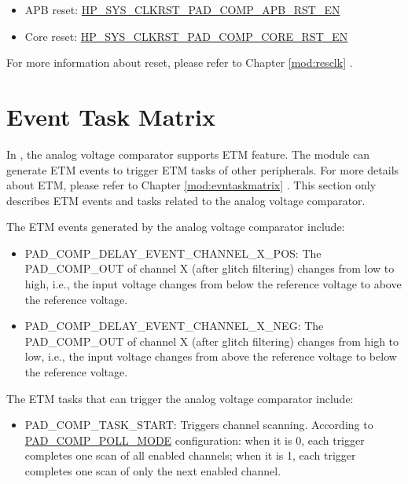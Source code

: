 \documentclass[main\_\_EN.tex]{subfiles}
\begin{document}
\begin{itemize}
    \item APB reset: \hyperref[fielddesc:HPSYSCLKRSTPADCOMPAPBRSTEN]{HP\_SYS\_CLKRST\_PAD\_COMP\_APB\_RST\_EN}
    \item Core reset: \hyperref[fielddesc:HPSYSCLKRSTPADCOMPCORERSTEN]{HP\_SYS\_CLKRST\_PAD\_COMP\_CORE\_RST\_EN}
\end{itemize}

For more information about reset, please refer to Chapter \ref{mod:resclk} \textit{}.


\section{Event Task Matrix}
\label{sec:anacom-etm-func}

In \chipname{}, the analog voltage comparator supports ETM feature. The module can generate ETM events to trigger ETM tasks of other peripherals. For more details about ETM, please refer to Chapter \ref{mod:evntaskmatrix} . This section only describes ETM events and tasks related to the analog voltage comparator.

The ETM events generated by the analog voltage comparator include:

\begin{itemize}
    \item PAD\_COMP\_DELAY\_EVENT\_CHANNEL\_X\_POS: The PAD\_COMP\_OUT of channel X (after glitch filtering) changes from low to high, i.e., the input voltage changes from below the reference voltage to above the reference voltage.
    \item PAD\_COMP\_DELAY\_EVENT\_CHANNEL\_X\_NEG: The PAD\_COMP\_OUT of channel X (after glitch filtering) changes from high to low, i.e., the input voltage changes from above the reference voltage to below the reference voltage.
\end{itemize}

The ETM tasks that can trigger the analog voltage comparator include:

\begin{itemize}
    \item PAD\_COMP\_TASK\_START: Triggers channel scanning. According to \hyperref[fielddesc:PADCOMPPOLLMODE]{PAD\_COMP\_POLL\_MODE} configuration: when it is 0, each trigger completes one scan of all enabled channels; when it is 1, each trigger completes one scan of only the next enabled channel.
\end{itemize}
\end{document}
